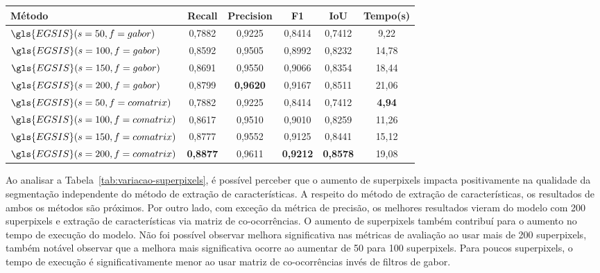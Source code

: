 \begin{table}[!h]
    \centering
  \begin{tabular}{lccccc}
    \toprule
    \textbf{Método}                  & \textbf{Recall} & \textbf{Precision} & \textbf{F1}     & \textbf{IoU}    & \textbf{Tempo(s)} \\
    \midrule \midrule
    $\gls{EGSIS}(s=50, f=gabor)$     & 0,7882          & 0,9225             & 0,8414          & 0,7412          & 9,22             \\
    $\gls{EGSIS}(s=100, f=gabor)$    & 0,8592          & 0,9505             & 0,8992          & 0,8232          & 14,78            \\
    $\gls{EGSIS}(s=150, f=gabor)$    & 0,8691          & 0,9550             & 0,9066          & 0,8354          & 18,44            \\
    $\gls{EGSIS}(s=200, f=gabor)$    & 0,8799          & \textbf{0,9620}    & 0,9167          & 0,8511          & 21,06            \\
    $\gls{EGSIS}(s=50, f=comatrix)$  & 0,7882          & 0,9225             & 0,8414          & 0,7412          & \textbf{4,94}    \\
    $\gls{EGSIS}(s=100, f=comatrix)$ & 0,8617          & 0,9510             & 0,9010          & 0,8259          & 11,26            \\
    $\gls{EGSIS}(s=150, f=comatrix)$ & 0,8777          & 0,9552             & 0,9125          & 0,8441          & 15,12            \\
    $\gls{EGSIS}(s=200, f=comatrix)$ & \textbf{0,8877} & 0,9611             & \textbf{0,9212} & \textbf{0,8578} & 19,08            \\
    \bottomrule
  \end{tabular}
  \Fonte{\fonteautor}
\end{table}

Ao analisar a Tabela~\ref{tab:variacao-superpixels}, é possível
perceber que o aumento de superpixels impacta positivamente na
qualidade da segmentação independente do método de extração de
características. A respeito do método de extração de características,
os resultados de ambos os métodos são próximos. Por outro lado, com
exceção da métrica de precisão, os melhores resultados vieram do
modelo com 200 superpixels e extração de características via matriz de
co-ocorrências. O aumento de superpixels também contribuí para o
aumento no tempo de execução do modelo. Não foi possível observar
melhora significativa nas métricas de avaliação ao usar mais de 200
superpixels, também notável observar que a melhora mais significativa
ocorre ao aumentar de 50 para 100 superpixels. Para poucos
superpixels, o tempo de execução é significativamente menor ao usar
matriz de co-ocorrências invés de filtros de gabor.

